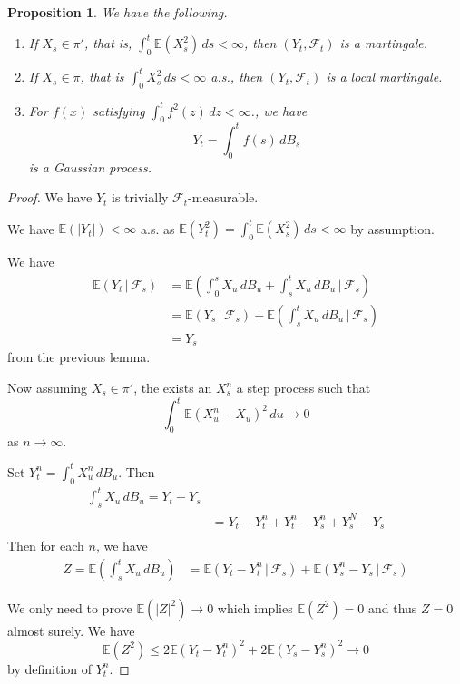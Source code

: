 \documentclass[10pt, oneside, reqno]{amsart}
\theoremstyle{plain}%
\newtheorem{prop}[thm]{Proposition}
\theoremstyle{definition}
\theoremstyle{remark}
\newcommand{\given}{ \, | \,}
\newcommand{\E}{\mathbb{E}}
\newcommand{\sigf}{\mathcal{F}}
\begin{document}
\begin{prop}We have the following.  
	\begin{enumerate}
		\item If $X_s \in \pi'$, that is, $\int_0^t \E(X_s^2) \, ds < \infty$, then $(Y_t, \sigf_t)$ is a martingale.
		\item If $X_s \in \pi$, that is $\int_0^t X_s^2 \, ds < \infty $ a.s., then $(Y_t, \sigf_t)$ is a local martingale.  
		\item For $f(x)$ satisfying $\int_0^t f^2(z) \, dz < \infty$., we have \[
			Y_t = \int_0^t f(s) \, dB_s
		\] is a Gaussian process.  
	\end{enumerate}
\end{prop}

\begin{proof}
	We have $Y_t$ is trivially $\sigf_t$-measurable.  
	
	We have $\E(|Y_t|) < \infty $ a.s. as $\E(Y_t^2) = \int_0^t \E(X_s^2) \, ds < \infty$ by assumption.  
	
	We have \begin{align*}
		\E(Y_t \given \sigf_s) &= \E(\int_0^s X_u \, dB_u + \int_s^t X_u \, dB_u \given \sigf_s ) \\
		&= \E(Y_s \given \sigf_s) + \E( \int_s^t X_u \, dB_u \given \sigf_s) \\
		&= Y_s			
	\end{align*}  from the previous lemma.
	
	Now assuming $X_s \in \pi'$, the exists an $X^n_s$ a step process such that \[
		\int_0^t \E(X^n_u - X_u)^2 \, du \rightarrow 0
	\] as $n \rightarrow \infty$.  
	
	Set $Y^n_t = \int_0^t X_u^n \, dB_u$.  Then \begin{align*}
		\int_s^t X_u \, dB_u = Y_t - Y_s \\
							&= Y_t - Y_t^n + Y_t^n - Y_s^n + Y_s^N - Y_s \\			
	\end{align*}
	Then for each $n$, we have \begin{align*}
		Z = \E(\int_s^t X_u \, dB_u ) &= \E(Y_t - Y_t^n \given \sigf_s) + \E(Y_s^n - Y_s \given \sigf_s) 
	\end{align*}  
	
	We only need to prove $\E(|Z|^2) \rightarrow 0$ which implies $\E(Z^2) = 0$ and thus $Z = 0$ almost surely.  We have \[
		\E(Z^2) \leq 2\E(Y_t - Y_t^n)^2 + 2\E(Y_s - Y_s^n)^2 \rightarrow 0
	\] by definition of $Y_t^n$.
	
	
\end{proof}
\end{document}
